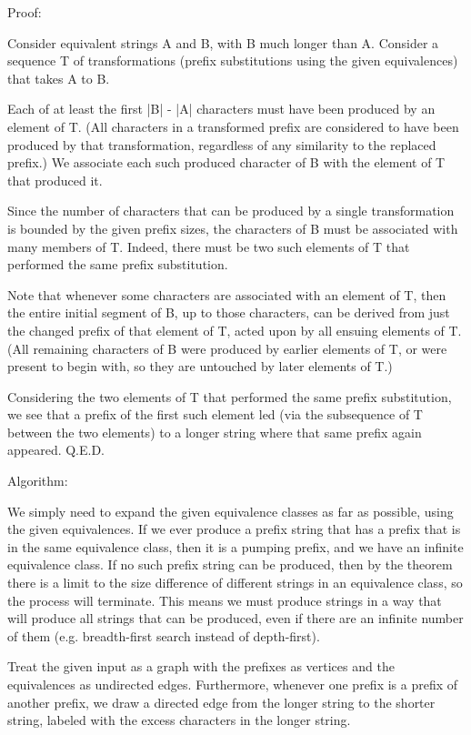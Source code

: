 \documentclass{book}
\begin{document}
Proof:

Consider equivalent strings A and B, with B much longer than A.  Consider a sequence T of transformations (prefix substitutions using the given equivalences) that takes A to B.

Each of at least the first |B| - |A| characters must have been produced by an element of T.  (All characters in a transformed prefix are considered to have been produced by that transformation, regardless of any similarity to the replaced prefix.)  We associate each such produced character of B with the element of T that produced it.

Since the number of characters that can be produced by a single transformation is bounded by the given prefix sizes, the characters of B must be associated with many members of T. Indeed, there must be two such elements of T that performed the same prefix substitution.

Note that whenever some characters are associated with an element of T, then the entire initial segment of B, up to those characters, can be derived from just the changed prefix of that element of T, acted upon by all ensuing elements of T.  (All remaining characters of B were produced by earlier elements of T, or were present to begin with, so they are untouched by later elements of T.)

Considering the two elements of T that performed the same prefix substitution, we see that a prefix of the first such element led (via the subsequence of T between the two elements) to a longer string where that same prefix again appeared.  Q.E.D.


Algorithm:

We simply need to expand the given equivalence classes as far as possible, using the given equivalences.  If we ever produce a prefix string that has a prefix that is in the same equivalence class, then it is a pumping prefix, and we have an infinite equivalence class.  If no such prefix string can be produced, then by the theorem there is a limit to the size difference of different strings in an equivalence class, so the process will terminate.  This means we must produce strings in a way that will produce all strings that can be produced, even if there are an infinite number of them (e.g. breadth-first search instead of depth-first).

Treat the given input as a graph with the prefixes as vertices and the equivalences as undirected edges.  Furthermore, whenever one prefix is a prefix of another prefix, we draw a directed edge from the longer string to the shorter string, labeled with the excess characters in the longer string.
\end{document}
